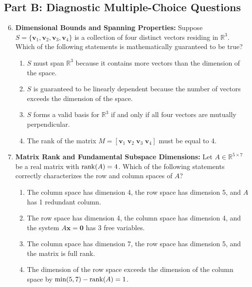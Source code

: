 \subsection*{Part B: Diagnostic Multiple-Choice Questions}
\begin{enumerate}
\setcounter{enumi}{5}
\item \textbf{Dimensional Bounds and Spanning Properties:} Suppose $S = \{\mathbf{v}_1, \mathbf{v}_2, \mathbf{v}_3, \mathbf{v}_4\}$ is a collection of four distinct vectors residing in $\mathbb{R}^3$. Which of the following statements is mathematically guaranteed to be true?
\begin{enumerate}
    \item $S$ must span $\mathbb{R}^3$ because it contains more vectors than the dimension of the space.
    \item $S$ is guaranteed to be linearly dependent because the number of vectors exceeds the dimension of the space.
    \item $S$ forms a valid basis for $\mathbb{R}^3$ if and only if all four vectors are mutually perpendicular.
    \item The rank of the matrix $M = [\mathbf{v}_1 \; \mathbf{v}_2 \; \mathbf{v}_3 \; \mathbf{v}_4]$ must be equal to 4.
\end{enumerate}

\item \textbf{Matrix Rank and Fundamental Subspace Dimensions:} Let $A \in \mathbb{R}^{5 \times 7}$ be a real matrix with $\operatorname{rank}(A) = 4$. Which of the following statements correctly characterizes the row and column spaces of $A$?
\begin{enumerate}
    \item The column space has dimension 4, the row space has dimension 5, and $A$ has 1 redundant column.
    \item The row space has dimension 4, the column space has dimension 4, and the system $A\mathbf{x} = \mathbf{0}$ has 3 free variables.
    \item The column space has dimension 7, the row space has dimension 5, and the matrix is full rank.
    \item The dimension of the row space exceeds the dimension of the column space by $\min(5, 7) - \operatorname{rank}(A) = 1$.
\end{enumerate}
\end{enumerate}
